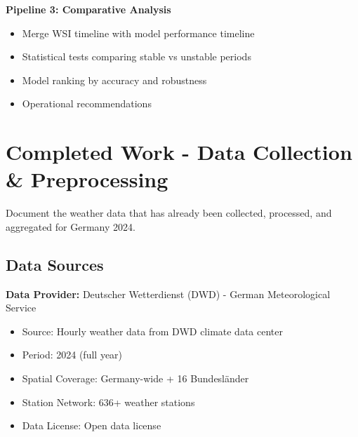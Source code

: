 \documentclass[11pt,a4paper]{article}
\begin{document}
\textbf{Pipeline 3: Comparative Analysis}
\begin{itemize}
    \item Merge WSI timeline with model performance timeline
    \item Statistical tests comparing stable vs unstable periods
    \item Model ranking by accuracy and robustness
    \item Operational recommendations
\end{itemize}

\section{Completed Work - Data Collection \& Preprocessing}

\begin{objectivebox}
Document the weather data that has already been collected, processed, and aggregated for Germany 2024.
\end{objectivebox}

\subsection{Data Sources}

\textbf{Data Provider:} Deutscher Wetterdienst (DWD) - German Meteorological Service
\begin{itemize}
    \item Source: Hourly weather data from DWD climate data center
    \item Period: 2024 (full year)
    \item Spatial Coverage: Germany-wide + 16 Bundesländer
    \item Station Network: 636+ weather stations
    \item Data License: Open data license
\end{itemize}
\end{document}
